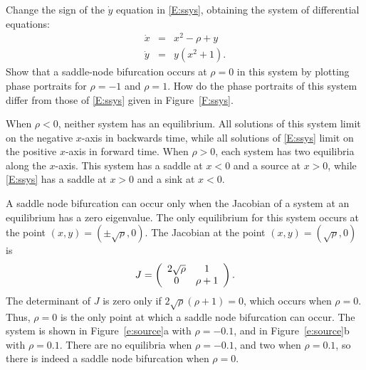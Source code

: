 \documentclass{ximera}
\begin{document}
\begin{exercise} \label{e:source}
Change the sign of the $\dot{y}$ equation in \eqref{E:ssys}, obtaining the 
system of differential equations:  
\[
\begin{array}{rcl}
\dot{x} & = & x^2 - \rho + y \\
\dot{y} & = & y(x^2+1).  \end{array}
\]
Show that a saddle-node bifurcation occurs at $\rho=0$ in this system by 
plotting phase portraits for $\rho=-1$ and $\rho=1$.  How do the 
phase portraits of this system differ from those of \eqref{E:ssys} 
given in Figure~\ref{F:ssys}.

\begin{solution}

\ans When $\rho < 0$, neither system has an equilibrium.  All solutions of
this system limit on the negative $x$-axis in backwards time, while all
solutions of \eqref{E:ssys} limit on the positive $x$-axis in forward time.
When $\rho > 0$, each system has two equilibria along the $x$-axis.  This
system has a saddle at $x < 0$ and a source at $x > 0$, while \eqref{E:ssys}
has a saddle at $x > 0$ and a sink at $x < 0$.

\soln
A saddle node bifurcation can occur only when the Jacobian of a system
at an equilibrium has a zero eigenvalue.  The only equilibrium for this
system occurs at the point $(x,y) = (\pm\sqrt{\rho},0)$.  The Jacobian
at the point $(x,y) = (\sqrt{\rho},0)$ is
\[
J = \left(\begin{array}{cc} 2\sqrt{\rho} & 1\\ 0 &\rho + 1\end{array}\right).
\]
The determinant of $J$ is zero only if $2\sqrt{\rho}(\rho + 1) = 0$, which
occurs when $\rho = 0$.  Thus, $\rho = 0$ is the only point at which a
saddle node bifurcation can occur.  The system is shown in
Figure~\ref{e:source}a with $\rho = -0.1$, and in Figure~\ref{e:source}b
with $\rho = 0.1$.  There are no equilibria when $\rho = -0.1$, and two
when $\rho = 0.1$, so there is indeed a saddle node bifurcation when
$\rho = 0$.

\begin{figure}[htb]
                       \centerline{%
                       }
\end{figure}

\end{solution}
\end{exercise}
\end{document}
